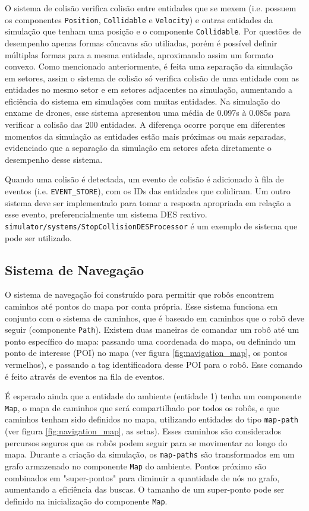 O sistema de colisão verifica colisão entre entidades que se mexem (i.e. possuem os componentes \texttt{Position}, \texttt{Collidable} e \texttt{Velocity}) e outras entidades da simulação que tenham uma posição e o componente \texttt{Collidable}. Por questões de desempenho apenas formas côncavas são utiliadas, porém é possível definir múltiplas formas para a mesma entidade, aproximando assim um formato convexo. Como mencionado anteriormente, é feita uma separação da simulação em setores, assim o sistema de colisão só verifica colisão de uma entidade com as entidades no mesmo setor e em setores adjacentes na simulação, aumentando a eficiência do sistema em simulações com muitas entidades. Na simulação do enxame de drones, esse sistema apresentou uma média de 0.097s à 0.085s para verificar a colisão das 200 entidades. A diferença ocorre porque em diferentes momentos da simulação as entidades estão mais próximas ou mais separadas, evidenciado que a separação da simulação em setores afeta diretamente o desempenho desse sistema.

Quando uma colisão é detectada, um evento de colisão é adicionado à fila de eventos (i.e. \texttt{EVENT\_STORE}), com os IDs das entidades que colidiram. Um outro sistema deve ser implementado para tomar a resposta apropriada em relação a esse evento, preferencialmente um sistema DES reativo. \texttt{simulator/systems/StopCollisionDESProcessor} é um exemplo de sistema que pode ser utilizado.

\subsection{Sistema de Navegação}
\label{sec:navigation}

O sistema de navegação foi construído para permitir que robôs encontrem caminhos até pontos do mapa por conta própria. Esse sistema funciona em conjunto com o sistema de caminhos, que é baseado em caminhos que o robõ deve seguir (componente \texttt{Path}). Existem duas maneiras de comandar um robô até um ponto específico do mapa: passando uma coordenada do mapa, ou definindo um ponto de interesse (POI) no mapa (ver figura \ref{fig:navigation_map}, os pontos vermelhos), e passando a tag identificadora desse POI para o robô. Esse comando é feito através de eventos na fila de eventos.

É esperado ainda que a entidade do ambiente (entidade 1) tenha um componente \texttt{Map}, o mapa de caminhos que será compartilhado por todos os robôs, e que caminhos tenham sido definidos no mapa, utilizando entidades do tipo \texttt{map-path} (ver figura \ref{fig:navigation_map}, as setas). Esses caminhos são considerados percursos seguros que os robôs podem seguir para se movimentar ao longo do mapa. Durante a criação da simulação, os \texttt{map-paths} são transformados em um grafo armazenado no componente \texttt{Map} do ambiente. Pontos próximo são combinados em "super-pontos" para diminuir a quantidade de nós no grafo, aumentando a eficiência das buscas. O tamanho de um super-ponto pode ser definido na inicialização do componente \texttt{Map}.

